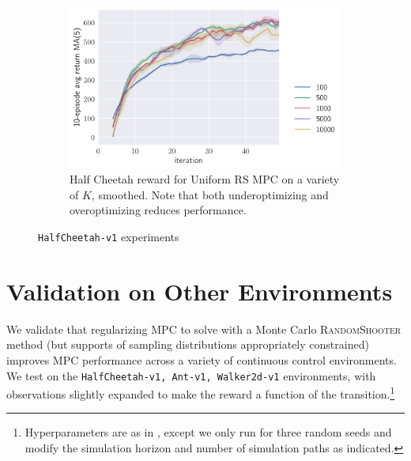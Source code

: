 \documentclass{article}
\begin{document}
\begin{figure}[!ht]
  \begin{subfigure}[b]{0.48\columnwidth}
    \centering
    \includegraphics[width=\textwidth]{mpc-return.pdf}
    \caption{%
      Half Cheetah reward for Uniform RS MPC on a variety of $K$, smoothed.
      Note that both underoptimizing and overoptimizing reduces performance.
    }\label{fig:mpc-reward}
  \end{subfigure}

  \caption{\texttt{HalfCheetah-v1} experiments}
  \label{fig:half-cheetah}
\end{figure}


\section{Validation on Other Environments}
We validate that regularizing MPC to solve  with a Monte Carlo \textsc{RandomShooter} method (but supports of sampling distributions appropriately constrained) improves MPC performance across a variety of continuous control environments. We test on the \texttt{HalfCheetah-v1, Ant-v1, Walker2d-v1} environments, with observations slightly expanded to make the reward a function of the transition.\footnote{Hyperparameters are as in , except we only run for three random seeds and modify the simulation horizon and number of simulation paths as indicated.}
\end{document}
